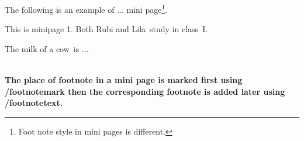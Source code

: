\documentclass[]{article}
\begin{document}
\hfill The following is an example of ... mini page\hfill \footnote{Foot note style in mini pages is different.}.\\[5mm]
%
\begin{minipage}[t]{0.45\linewidth}
This is minipage 1. Both Rubi and Lila\footnotemark\ study in class~I.
\end{minipage}
%
\hfill
%
\begin{minipage}[t]{0.35\linewidth}
The milk of a cow\footnotemark\ is ... 
\end{minipage}
\\[8mm]
%
\bfseries
The place of footnote in a mini page is marked first using \linebreak /footnotemark then the corresponding footnote is added later using \mbox{/footnotetext}.
	
\end{document}
